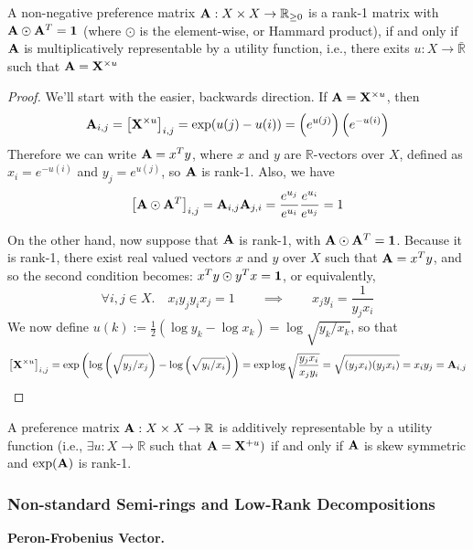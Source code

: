 \documentclass{article}
\begin{document}
	\begin{prop}\label{prop:decomp}
		A non-negative preference matrix $\mathbf A : X \times X \to \mathbb R_{\geq 0}$ is a rank-1 matrix with $\mathbf A \odot \mathbf A^T = \mathbf 1$ (where $\odot$ is the element-wise, or Hammard product), if and only if $\mathbf A$ is multiplicatively representable by a utility function, i.e., there exits $u : X \to \bar{\mathbb  R}$ such that $\mathbf A = \mathbf X^{\times u}$
	\end{prop}
	\begin{proof}
		We'll start with the easier, backwards direction. If $\mathbf A = \mathbf X^{\times u}$, then
		\[ \mathbf A_{i,j} = \big[\mathbf X^{\times u}\big]_{i,j} =  \exp(u(j) - u(i)) = \left(e^{u(j)}\right)\left(e^{-u(i)}\right) \]
		Therefore we can write $\mathbf A =  x^T  y$, where $x$ and $y$ are $\mathbb R$-vectors over $X$, defined as $ x_i = e^{-u(i)}$ and $ y_j = e^{u(j)}$, so $\mathbf A$ is rank-1. Also, we have 
		\[ \big[\mathbf A \odot \mathbf A^T\big]_{i,j} =  \mathbf A_{i,j} \mathbf A_{j,i} = \frac{e^{u_j}}{e^{u_i}} \frac{e^{u_i}}{e^{u_j}} = 1\]
		
		On the other hand, now suppose that $\mathbf A$ is rank-1, with $\mathbf A \odot \mathbf A^T = \mathbf 1$. Because it is rank-1, there exist real valued vectors $x$ and $y$ over $X$ such that $\mathbf A  = x^T y$, and so the second condition becomes: $x^T y \odot y^T x = \mathbf 1$, or equivalently,
		\[ \forall i,j \in X.\quad x_i y_j y_i x_j  = 1 \qquad\implies\qquad x_j y_i = \frac{1}{y_j x_i} \]
		We now define $u(k) := \frac{1}{2} (\log y_k - \log x_k) = \log\sqrt{y_k / x_k}$, so that
		\[ \big[\mathbf X^{\times u}\big]_{i,j} = \exp\left(\log\left(\sqrt{y_j/x_j}\right)- \log\left(\sqrt{y_i/x_i}\right)\right) 
			= \exp\log\sqrt\frac{y_j x_i}{x_j y_i} 
			= \sqrt{(y_j x_i)(y_j x_i)} = x_i y_j = \mathbf A_{i,j}\]
	\end{proof}

	

	\begin{coro}
		A preference matrix $\mathbf A : X \times X \to \mathbb R$ is additively representable by a utility function (i.e., $\exists u : X \to \mathbb R$ such that $\mathbf A = \mathbf X^{+u})$ if and only if $\mathbf A$ is skew symmetric and $\exp (\mathbf A)$ is rank-1.
	\end{coro}
	
	
	
	\subsubsection{Non-standard Semi-rings and Low-Rank Decompositions}
	\textbf{Peron-Frobenius Vector.}
	
\end{document}
